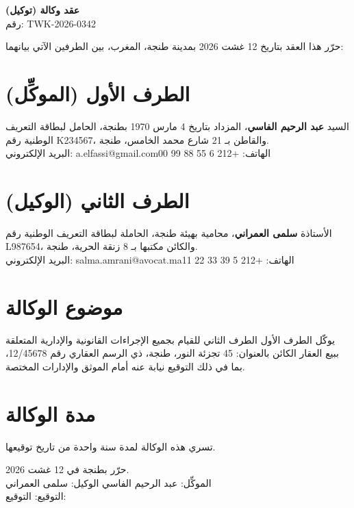 \documentclass[12pt,a4paper]{article}
\begin{document}
\begin{center}
{\LARGE\bfseries\color{accent} عقد وكالة (توكيل)}\\[0.3em]
{\small رقم: \textenglish{TWK-2026-0342}}
\end{center}
\vspace{0.6em}

حرّر هذا العقد بتاريخ 12 غشت 2026 بمدينة طنجة، المغرب، بين الطرفين الآتي بيانهما:

\vspace{0.6em}
\section{الطرف الأول (الموكِّل)}
السيد \textbf{عبد الرحيم الفاسي}، المزداد بتاريخ 4 مارس 1970 بطنجة،
الحامل لبطاقة التعريف الوطنية رقم \textenglish{K234567}،
والقاطن بـ 21 شارع محمد الخامس، طنجة.\\
البريد الإلكتروني: \textenglish{a.elfassi@gmail.com}\quad الهاتف: \textenglish{+212 6 55 88 99 00}

\vspace{0.4em}
\section{الطرف الثاني (الوكيل)}
الأستاذة \textbf{سلمى العمراني}، محامية بهيئة طنجة،
الحاملة لبطاقة التعريف الوطنية رقم \textenglish{L987654}،
والكائن مكتبها بـ 8 زنقة الحرية، طنجة.\\
البريد الإلكتروني: \textenglish{salma.amrani@avocat.ma}\quad الهاتف: \textenglish{+212 5 39 33 22 11}

\section{موضوع الوكالة}
يوكّل الطرف الأول الطرف الثاني للقيام بجميع الإجراءات القانونية والإدارية
المتعلقة ببيع العقار الكائن بالعنوان: 45 تجزئة النور، طنجة، ذي الرسم العقاري
رقم \textenglish{12/45678}، بما في ذلك التوقيع نيابة عنه أمام الموثق والإدارات المختصة.

\section{مدة الوكالة}
تسري هذه الوكالة لمدة سنة واحدة من تاريخ توقيعها.

\vspace{1.5em}
حرّر بطنجة في 12 غشت 2026.\\[1.5em]
الموكِّل: عبد الرحيم الفاسي \hfill الوكيل: سلمى العمراني\\[1em]
التوقيع: \underline{\hspace{4cm}} \hfill التوقيع: \underline{\hspace{4cm}}
\end{document}
